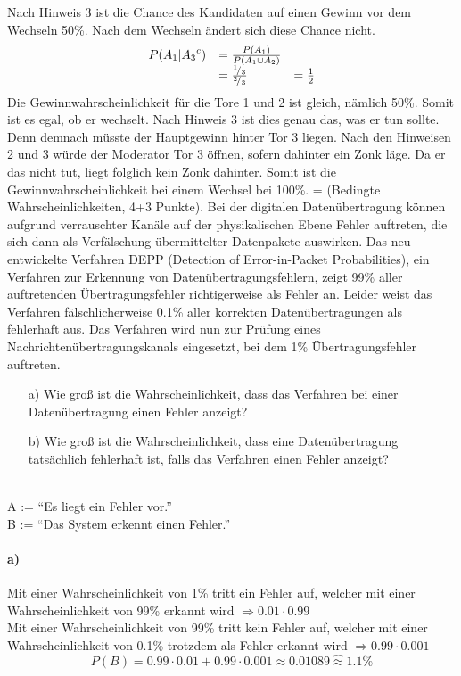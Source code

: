 \documentclass[twoside]{article}
\begin{document}
\sss
Nach Hinweis 3 ist die Chance des Kandidaten auf einen Gewinn vor dem Wechseln 50\%.
Nach dem Wechseln ändert sich diese Chance nicht.
\[
	\begin{array}{lll}
		P (A_1 | {A_3}^c)	&=	\frac{P(A_1)}{P(A_1\cup A_2)}	&\\
									&=	\frac{{}^{1}\!/_{3}}{{}^{2}\!/_{3}}	&= \frac{1}{2}
	\end{array}
\]
Die Gewinnwahrscheinlichkeit für die Tore 1 und 2 ist gleich, nämlich 50\%.
Somit ist es egal, ob er wechselt.
\sss
Nach Hinweis 3 ist dies genau das, was er tun sollte.
Denn demnach müsste der Hauptgewinn hinter Tor 3 liegen.
Nach den Hinweisen 2 und 3 würde der Moderator Tor 3 öffnen, sofern dahinter ein Zonk läge.
Da er das nicht tut, liegt folglich kein Zonk dahinter.
Somit ist die Gewinnwahrscheinlichkeit bei einem Wechsel bei 100\%.
\fi
\newpage
\chead{}
\rhead{\memTwoName\\\memTwoNr}
\ifnum\ZettelAcht=\True
{}
(Bedingte Wahrscheinlichkeiten, 4+3 Punkte).
Bei der digitalen Datenübertragung können aufgrund verrauschter Kanäle auf der physikalischen Ebene Fehler auftreten, die sich dann als Verfälschung übermittelter Datenpakete auswirken.
Das neu entwickelte Verfahren DEPP (Detection of Error-in-Packet Probabilities), ein Verfahren zur Erkennung von
Datenübertragungsfehlern, zeigt 99\% aller auftretenden Übertragungsfehler richtigerweise als Fehler an.
Leider weist das Verfahren fälschlicherweise 0.1\% aller korrekten Datenübertragungen als fehlerhaft aus.
Das Verfahren wird nun zur Prüfung eines Nachrichtenübertragungskanals eingesetzt, bei dem 1\% Übertragungsfehler auftreten. 
\begin{enumerate}
	\item[a)] Wie groß ist die Wahrscheinlichkeit, dass das Verfahren bei einer Datenübertragung einen Fehler anzeigt?
	\item[b)] Wie groß ist die Wahrscheinlichkeit, dass eine Datenübertragung tatsächlich fehlerhaft ist, falls das Verfahren einen Fehler anzeigt?
\end{enumerate}
\vspace{.3cm}\-\\
A := ``Es liegt ein Fehler vor.''\\
B := ``Das System erkennt einen Fehler.''
\paragraph{a)}
Mit einer Wahrscheinlichkeit von 1\% tritt ein Fehler auf, welcher mit einer Wahrscheinlichkeit von 99\% erkannt wird $ \Rightarrow0.01\cdot 0.99$\\
Mit einer Wahrscheinlichkeit von 99\% tritt kein Fehler auf, welcher mit einer Wahrscheinlichkeit von 0.1\% trotzdem als Fehler erkannt wird $\Rightarrow0.99\cdot 0.001$
\[
	P(B)=0.99\cdot0.01+0.99\cdot0.001\approx0.01089\hat{\approx}1.1\%
\]
\end{document}
